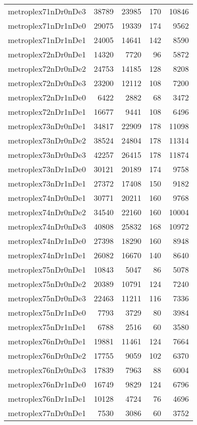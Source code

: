 \begin{longtable}{lrrrr}
metroplex71nDr0nDe3 & 38789 & 23985 & 170 & 10846 \\
metroplex71nDr1nDe0 & 29075 & 19339 & 174 & 9562 \\
metroplex71nDr1nDe1 & 24005 & 14641 & 142 & 8590 \\
metroplex72nDr0nDe1 & 14320 & 7720 & 96 & 5872 \\
metroplex72nDr0nDe2 & 24753 & 14185 & 128 & 8208 \\
metroplex72nDr0nDe3 & 23200 & 12112 & 108 & 7200 \\
metroplex72nDr1nDe0 & 6422 & 2882 & 68 & 3472 \\
metroplex72nDr1nDe1 & 16677 & 9441 & 108 & 6496 \\
metroplex73nDr0nDe1 & 34817 & 22909 & 178 & 11098 \\
metroplex73nDr0nDe2 & 38524 & 24804 & 178 & 11314 \\
metroplex73nDr0nDe3 & 42257 & 26415 & 178 & 11874 \\
metroplex73nDr1nDe0 & 30121 & 20189 & 174 & 9758 \\
metroplex73nDr1nDe1 & 27372 & 17408 & 150 & 9182 \\
metroplex74nDr0nDe1 & 30771 & 20211 & 160 & 9768 \\
metroplex74nDr0nDe2 & 34540 & 22160 & 160 & 10004 \\
metroplex74nDr0nDe3 & 40808 & 25832 & 168 & 10972 \\
metroplex74nDr1nDe0 & 27398 & 18290 & 160 & 8948 \\
metroplex74nDr1nDe1 & 26082 & 16670 & 140 & 8640 \\
metroplex75nDr0nDe1 & 10843 & 5047 & 86 & 5078 \\
metroplex75nDr0nDe2 & 20389 & 10791 & 124 & 7240 \\
metroplex75nDr0nDe3 & 22463 & 11211 & 116 & 7336 \\
metroplex75nDr1nDe0 & 7793 & 3729 & 80 & 3984 \\
metroplex75nDr1nDe1 & 6788 & 2516 & 60 & 3580 \\
metroplex76nDr0nDe1 & 19881 & 11461 & 124 & 7664 \\
metroplex76nDr0nDe2 & 17755 & 9059 & 102 & 6370 \\
metroplex76nDr0nDe3 & 17839 & 7963 & 88 & 6004 \\
metroplex76nDr1nDe0 & 16749 & 9829 & 124 & 6796 \\
metroplex76nDr1nDe1 & 10128 & 4724 & 76 & 4696 \\
metroplex77nDr0nDe1 & 7530 & 3086 & 60 & 3752 \\

\end{longtable}
